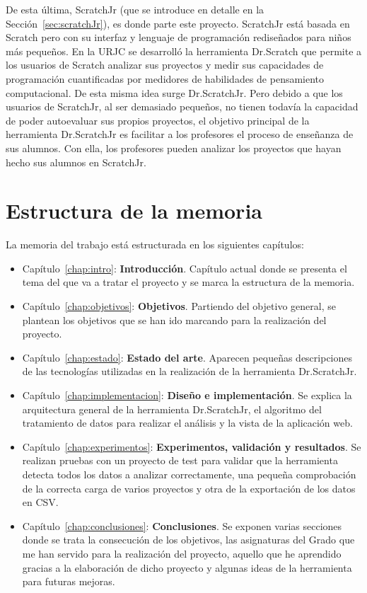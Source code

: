 \documentclass[a4paper, 12pt]{book}
\begin{document}
De esta última, ScratchJr (que se introduce en detalle en la Sección~\ref{sec:scratchJr}), es donde parte este proyecto.
ScratchJr está basada en Scratch pero con su interfaz y lenguaje de programación rediseñados para niños más pequeños.
En la URJC se desarrolló la herramienta Dr.Scratch que permite a los usuarios de Scratch analizar sus proyectos y medir sus capacidades de programación cuantificadas por medidores de habilidades de pensamiento computacional.
De esta misma idea surge Dr.ScratchJr.
Pero debido a que los usuarios de ScratchJr, al ser demasiado pequeños, no tienen todavía la capacidad de poder autoevaluar sus propios proyectos, el objetivo principal de la herramienta Dr.ScratchJr es facilitar a los profesores el proceso de enseñanza de sus alumnos.
Con ella, los profesores pueden analizar los proyectos que hayan hecho sus alumnos en ScratchJr.

\section{Estructura de la memoria}
\label{sec:estructura}

La memoria del trabajo está estructurada en los siguientes capítulos:

\begin{itemize}
    \item Capítulo~\ref{chap:intro}: \textbf{Introducción}.
    Capítulo actual donde se presenta el tema del que va a tratar el proyecto y se marca la estructura de la memoria.
    \item Capítulo~\ref{chap:objetivos}: \textbf{Objetivos}. 
    Partiendo del objetivo general, se plantean los objetivos que se han ido marcando para la realización del proyecto.
    \item Capítulo~\ref{chap:estado}: \textbf{Estado del arte}. 
    Aparecen pequeñas descripciones de las tecnologías utilizadas en la realización de la herramienta Dr.ScratchJr.
    \item Capítulo~\ref{chap:implementacion}: \textbf{Diseño e implementación}. 
    Se explica la arquitectura general de la herramienta Dr.ScratchJr, el algoritmo del tratamiento de datos para realizar el análisis y la vista de la aplicación web.
    \item Capítulo~\ref{chap:experimentos}: \textbf{Experimentos, validación y resultados}. 
    Se realizan pruebas con un proyecto de test para validar que la herramienta detecta todos los datos a analizar correctamente, una pequeña comprobación de la correcta carga de varios proyectos y otra de la exportación de los datos en CSV.
    \item Capítulo~\ref{chap:conclusiones}: \textbf{Conclusiones}. 
    Se exponen varias secciones donde se trata la consecución de los objetivos, las asignaturas del Grado que me han servido para la realización del proyecto, aquello que he aprendido gracias a la elaboración de dicho proyecto y algunas ideas de la herramienta para futuras mejoras.
    
\end{itemize}
\end{document}
